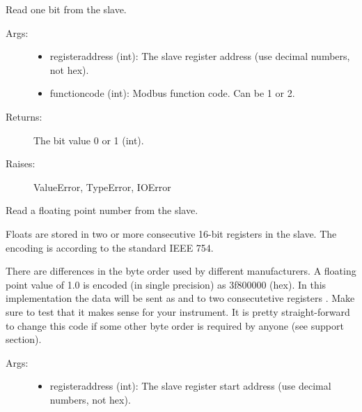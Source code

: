\documentclass[letterpaper,10pt,english]{sphinxmanual}
\begin{document}
\begin{fulllineitems}
\begin{fulllineitems}
\end{fulllineitems}


\begin{fulllineitems}
\label{minimalmodbus:minimalmodbus.Instrument.read_bit}
Read one bit from the slave.
\begin{description}
\item[{Args:}] \leavevmode\begin{itemize}
\item {} 
registeraddress (int): The slave register address (use decimal numbers, not hex).

\item {} 
functioncode (int): Modbus function code. Can be 1 or 2.

\end{itemize}

\item[{Returns:}] \leavevmode
The bit value 0 or 1 (int).

\item[{Raises:}] \leavevmode
ValueError, TypeError, IOError

\end{description}

\end{fulllineitems}


\begin{fulllineitems}
\label{minimalmodbus:minimalmodbus.Instrument.read_float}
Read a floating point number from the slave.

Floats are stored in two or more consecutive 16-bit registers in the slave. The
encoding is according to the standard IEEE 754.

There are differences in the byte order used by different manufacturers. A floating
point value of 1.0 is encoded (in single precision) as 3f800000 (hex). In this
implementation the data will be sent as  and 
to two consecutetive registers . Make sure to test that it makes sense for your instrument.
It is pretty straight-forward to change this code if some other byte order is
required by anyone (see support section).
\begin{description}
\item[{Args:}] \leavevmode\begin{itemize}
\item {} 
registeraddress (int): The slave register start address (use decimal numbers, not hex).


\end{itemize}
\end{description}
\end{fulllineitems}
\end{fulllineitems}
\end{document}
